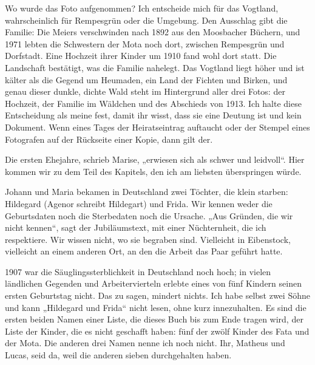 \documentclass[
  ngerman,
  11pt,
  openany]{book}
\begin{document}
Wo wurde das Foto aufgenommen? Ich entscheide mich für das Vogtland,
wahrscheinlich für Rempesgrün oder die Umgebung. Den Ausschlag gibt die
Familie: Die Meiers verschwinden nach 1892 aus den Moosbacher Büchern,
und 1971 lebten die Schwestern der Mota noch dort, zwischen Rempesgrün
und Dorfstadt. Eine Hochzeit ihrer Kinder um 1910 fand wohl dort statt.
Die Landschaft bestätigt, was die Familie nahelegt. Das Vogtland liegt
höher und ist kälter als die Gegend um Heumaden, ein Land der Fichten
und Birken, und genau dieser dunkle, dichte Wald steht im Hintergrund
aller drei Fotos: der Hochzeit, der Familie im Wäldchen und des
Abschieds von 1913. Ich halte diese Entscheidung als meine fest, damit
ihr wisst, dass sie eine Deutung ist und kein Dokument. Wenn eines Tages
der Heiratseintrag auftaucht oder der Stempel eines Fotografen auf der
Rückseite einer Kopie, dann gilt der.

Die ersten Ehejahre, schrieb Marise, „erwiesen sich als schwer und
leidvoll``. Hier kommen wir zu dem Teil des Kapitels, den ich am
liebsten überspringen würde.

Johann und Maria bekamen in Deutschland zwei Töchter, die klein starben:
Hildegard (Agenor schreibt Hildegart) und Frida. Wir kennen weder die
Geburtsdaten noch die Sterbedaten noch die Ursache. „Aus Gründen, die
wir nicht kennen``, sagt der Jubiläumstext, mit einer Nüchternheit, die
ich respektiere. Wir wissen nicht, wo sie begraben sind. Vielleicht in
Eibenstock, vielleicht an einem anderen Ort, an den die Arbeit das Paar
geführt hatte.

1907 war die Säuglingssterblichkeit in Deutschland noch hoch; in vielen
ländlichen Gegenden und Arbeitervierteln erlebte eines von fünf Kindern
seinen ersten Geburtstag nicht. Das zu sagen, mindert nichts. Ich habe
selbst zwei Söhne und kann „Hildegard und Frida`` nicht lesen, ohne kurz
innezuhalten. Es sind die ersten beiden Namen einer Liste, die dieses
Buch bis zum Ende tragen wird, der Liste der Kinder, die es nicht
geschafft haben: fünf der zwölf Kinder des Fata und der Mota. Die
anderen drei Namen nenne ich noch nicht. Ihr, Matheus und Lucas, seid
da, weil die anderen sieben durchgehalten haben.
\end{document}
